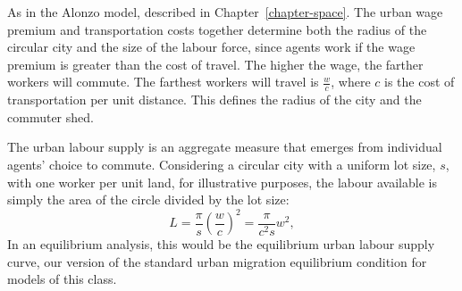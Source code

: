 
As in the Alonzo model, described in Chapter~\ref{chapter-space}. The {urban wage premium} and transportation costs together determine both the radius of the circular city and the size of the labour force, %
since agents work if the wage premium is greater than the cost of travel. %
The higher the wage, the  farther workers will commute. %
The farthest workers will travel  is $\frac{w}{{c}}$, where ${c}$ is the cost of transportation per unit distance. This defines the radius of the city and the commuter shed.

The \gls{urban labour supply} is an \gls{aggregate} measure that emerges from individual agents' choice to commute. Considering a \gls{circular city} with a uniform lot size, $s$, with one worker per unit land, for illustrative purposes, the labour available is simply the area of the circle divided by the lot size: 
\begin{equation}
 L = \frac{\pi}{s} \left(\frac{w}{{c}}\right)^2
   =\frac{\pi}{{c}^2 s} w^2,
\label{eqn-labour-supply1}
\end{equation}
In an equilibrium analysis, this would be the equilibrium \gls{urban labour supply} curve, our version of the standard urban \gls{migration equilibrium} condition for models of this class. %

